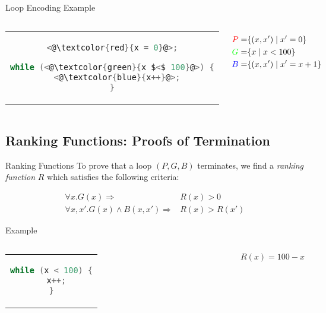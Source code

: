 \documentclass[xcolor=pdftex,t,11pt]{beamer}
\begin{document}
\begin{frame}[fragile]{Loop Encoding Example}

\begin{columns}[c]

 \begin{center}
 \begin{tabular}{c}

 \begin{lstlisting}[language=C,basicstyle=\normalsize,mathescape]
<@\textcolor{red}{x = 0}@>;

while (<@\textcolor{green}{x $<$ 100}@>) {
  <@\textcolor{blue}{x++}@>;
}
 \end{lstlisting}
 \end{tabular}
 \end{center}

\begin{eqnarray*}
 \textcolor{red}{P} = & \{ (x, x') \mid x' = 0 \} \\
 \textcolor{green}{G} = & \{ x \mid x < 100 \} \\
 \textcolor{blue}{B} = & \{ (x, x') \mid x' = x + 1 \}
\end{eqnarray*}
\end{columns}

\end{frame}



\subsection{Ranking Functions: Proofs of Termination}

\begin{frame}[fragile]{Ranking Functions}
 To prove that a loop $(P, G, B)$ terminates, we find a \emph{ranking function} $R$ which satisfies the following criteria:

 \begin{eqnarray*}
  \forall x . G(x) \Rightarrow & R(x) > 0 \\
  \forall x, x' . G(x) \wedge B(x, x') \Rightarrow & R(x) > R(x')
 \end{eqnarray*}

\pause

\begin{exampleblock}{Example}
\begin{center}
\begin{columns}[c]
  \begin{tabular}{c}
   \begin{lstlisting}[language=c,basicstyle=\normalsize]
while (x < 100) {
  x++;
}
   \end{lstlisting}
  \end{tabular}
 $R(x) = 100 - x$
\end{columns}
\end{center}
\end{exampleblock}

\end{frame}
\end{document}
